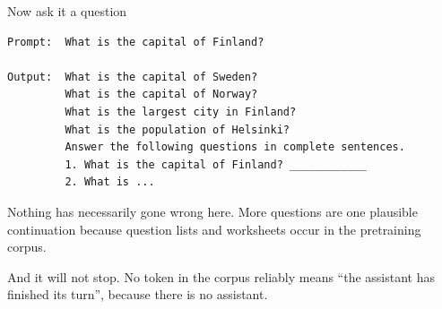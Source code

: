 \documentclass[aspectratio=169,10pt]{beamer}
\begin{document}
\begin{frame}[fragile]{Now ask it a question}
\begin{lstlisting}
Prompt:  What is the capital of Finland?

Output:  What is the capital of Sweden?
         What is the capital of Norway?
         What is the largest city in Finland?
         What is the population of Helsinki?
         Answer the following questions in complete sentences.
         1. What is the capital of Finland? ____________
         2. What is ...
\end{lstlisting}
  \vspace{0.3em}
  Nothing has necessarily gone wrong here. More questions are one plausible
  continuation because question lists and worksheets occur in the pretraining
  corpus.
  \vspace{0.4em}

  \alert{And it will not stop.} No token in the corpus reliably means ``the
  assistant has finished its turn'', because there is no assistant.
\end{frame}
\end{document}
